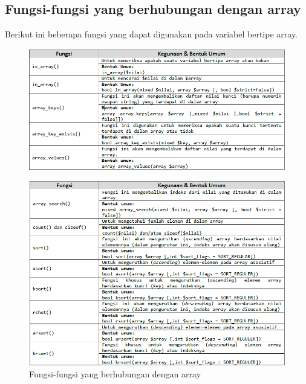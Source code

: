 \subsection{Fungsi-fungsi yang berhubungan dengan array}
Berikut ini beberapa fungsi yang dapat digunakan pada variabel bertipe array.
\begin{figure}[!htbp]
 \centering
 \includegraphics[width=.90\textwidth]{figures/fungsi_array.png}
\end{figure}

\begin{figure}[!htbp]
 \centering
\includegraphics[width=.90\textwidth]{figures/fungsi_array2.png}
 \caption{Fungsi-fungsi yang berhubungan dengan array}\label{fig:inputchapter}
\end{figure}

